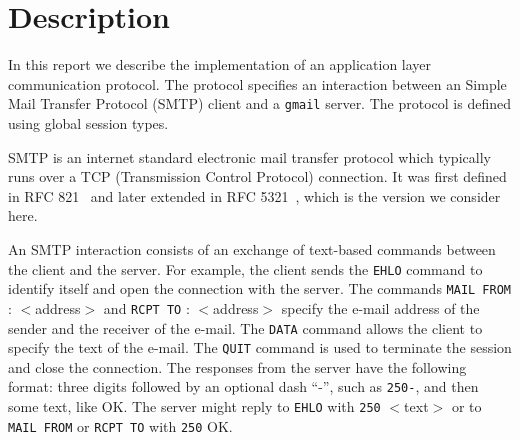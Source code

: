 \section{Description}
\label{sec: smtp_description}

In this report we describe the implementation of
an application layer communication protocol.
The protocol specifies an interaction between
an Simple Mail Transfer Protocol (SMTP) client and a \lstinline|gmail| server.
The protocol is defined using global session types.

{SMTP} is an internet standard
electronic mail transfer protocol which typically runs over a TCP
(Transmission Control Protocol) connection.
It was first defined in RFC
821~\cite{SMTP-rfc} and later extended in RFC 5321~\cite{ESMTP-rfc},
which is the version we consider here.
%

An SMTP interaction consists of an exchange of text-based {commands}
between the client and the server.
For example, the client sends the
\lstinline|EHLO| command to identify itself and open the connection with
the server.
%
The commands \lstinline|MAIL FROM| : $<$address$>$ and \lstinline|RCPT TO| : $<$address$>$
specify the e-mail address of the sender and the
receiver of the e-mail.
%
The \lstinline|DATA| command allows the client to specify the text of
the e-mail. The \lstinline|QUIT| command is used to terminate the
session and close the connection. The responses from the server have the
following format: three digits followed by an optional dash ``-'', such
as \lstinline|250-|, and then some text, like OK. The server might reply
to \lstinline|EHLO| with \lstinline|250| $<$text$>$ or to
\lstinline|MAIL FROM| or \lstinline|RCPT TO| with \lstinline|250| OK.

